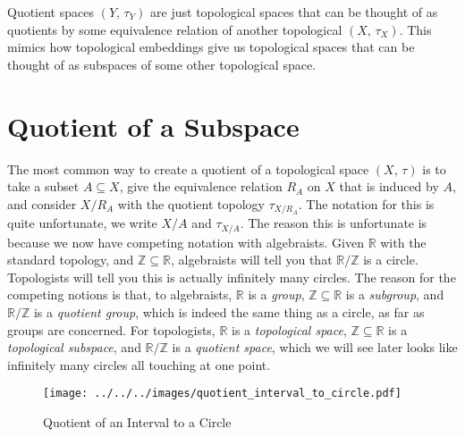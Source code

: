 \documentclass{article}
\theoremstyle{plain}
\theoremstyle{normal}
\begin{document}
        Quotient spaces $(Y,\,\tau_{Y})$ are just topological spaces that can
        be thought of as quotients by some equivalence relation of another
        topological $(X,\,\tau_{X})$. This mimics how topological embeddings
        give us topological spaces that can be thought of as subspaces of some
        other topological space.
    \section{Quotient of a Subspace}
        The most common way to create a quotient of a topological space
        $(X,\,\tau)$ is to take a subset $A\subseteq{X}$, give the equivalence
        relation $R_{A}$ on $X$ that is induced by $A$, and consider
        $X/R_{A}$ with the quotient topology $\tau_{X/R_{A}}$. The notation for
        this is quite unfortunate, we write $X/A$ and $\tau_{X/A}$. The reason
        this is unfortunate is because we now have competing notation with
        algebraists. Given $\mathbb{R}$ with the standard topology, and
        $\mathbb{Z}\subseteq\mathbb{R}$, algebraists will tell you that
        $\mathbb{R}/\mathbb{Z}$ is a circle. Topologists will tell you this is
        actually infinitely many circles. The reason for the competing notions
        is that, to algebraists, $\mathbb{R}$ is a \textit{group},
        $\mathbb{Z}\subseteq\mathbb{R}$ is a \textit{subgroup}, and
        $\mathbb{R}/\mathbb{Z}$ is a \textit{quotient group}, which is indeed
        the same thing as a circle, as far as groups are concerned. For
        topologists, $\mathbb{R}$ is a \textit{topological space},
        $\mathbb{Z}\subseteq\mathbb{R}$ is a \textit{topological subspace},
        and $\mathbb{R}/\mathbb{Z}$ is a \textit{quotient space}, which we will
        see later looks like infinitely many circles all touching at one point.
        \begin{figure}
            \centering
            \texttt{[image: ../../../images/quotient\_interval\_to\_circle.pdf]}
            \caption{Quotient of an Interval to a Circle}
            \label{fig:quotient_interval_to_circle}
        \end{figure}
\end{document}
